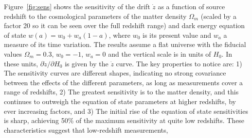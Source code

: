 \documentclass[preprint2, 10pt]{aastex}
\newcommand{\om}{\Omega_m}
\begin{document}
Figure~\ref{fig:sens} shows the sensitivity of the drift $\dot z$ as a 
function of source redshift to the cosmological parameters of the matter 
density $\om$
(scaled by a factor 20 so it can be seen over the full redshift range)
and dark energy equation of state $w(a)=w_0+w_a(1-a)$, where 
$w_0$ is its present value and $w_a$ a measure of its time variation.
The results
assume
a flat universe with
the fiducial values $\om=0.3$, $w_0=-1$, $w_a=0$ and the 
vertical scale is in units of $H_0$.  In these units, 
$\partial\dot z/\partial H_0$ is 
given by the $\dot z$ curve. The key properties to notice are: 
1) The sensitivity curves are different 
shapes, indicating no strong covariance between the effects of the different 
parameters, as long as measurements cover a range of redshifts, 
2) The greatest sensitivity is to the matter density, and this 
continues to outweigh the equation of state parameters at higher redshifts, 
by ever increasing factors, and 3) The initial rise of the equation of 
state sensitivities is sharp, achieving 50\% of the maximum sensitivity 
at quite low redshifts. These characteristics suggest that low-redshift 
measurements, 
\end{document}
